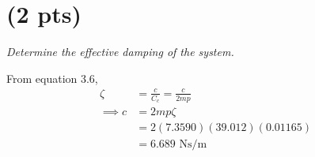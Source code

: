 \section{(2 pts)}
\textit{Determine the effective damping of the system.}

From equation 3.6,
\begin{align*}
    \zeta &= \frac{c}{C_c} = \frac{c}{2mp} \\
    \implies c &= 2mp\zeta \\
    &= 2 (7.3590)(39.012)(0.01165) \\\
    &= \boxed{6.689 \text{ Ns/m}}
\end{align*}